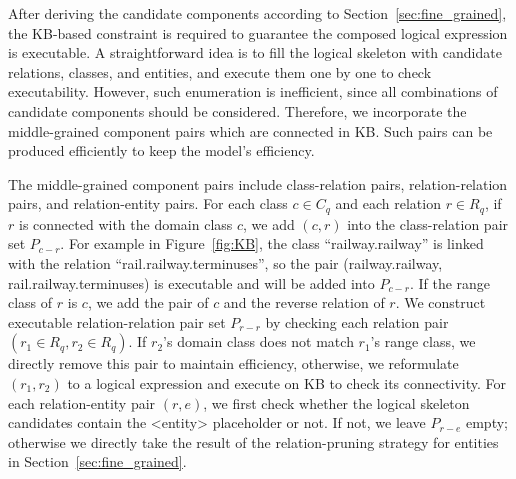 After deriving the candidate components according to Section~\ref{sec:fine_grained},
the KB-based constraint is required to guarantee the composed logical expression is executable. 
A straightforward idea is to fill the logical skeleton with candidate relations, classes, and entities, and execute them one by one to check executability.
However, such enumeration is inefficient, since all combinations of candidate components should be considered. Therefore, we incorporate the middle-grained component pairs which are connected in KB. Such pairs can be produced efficiently to keep the model's efficiency.

The middle-grained component pairs include class-relation pairs, relation-relation pairs, and relation-entity pairs. For each class $c \in C_q$ and each relation $r \in R_q$, if $r$ is connected with the domain class $c$, we add $(c, r)$ into the class-relation pair set $P_{c-r}$. For example in Figure~\ref{fig:KB}, the class ``railway.railway'' is linked with the relation ``rail.railway.terminuses'', so the pair (railway.railway, rail.railway.terminuses) is executable and will be added into $P_{c-r}$. If the range class of $r$ is $c$, we add the pair of $c$ and the reverse relation of $r$. 
We construct executable relation-relation pair set $P_{r-r}$ by checking each relation pair $(r_1\in R_q, r_2\in R_q)$. If $r_2$'s domain class does not match $r_1$'s range class, we directly remove this pair to maintain efficiency, otherwise, we reformulate $(r_1, r_2)$ to a logical expression and execute on KB to check its connectivity. 
For each relation-entity pair $(r, e)$, we first check whether the logical skeleton candidates contain the <entity> placeholder or not. If not, we leave $P_{r-e}$ empty; otherwise we directly take the result of the relation-pruning strategy for entities in Section~\ref{sec:fine_grained}. 


